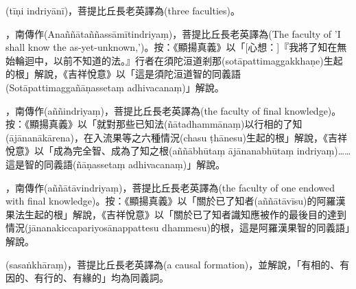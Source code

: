 \startitemgroup[noteitems]
\item{}(tīṇi indriyānī)，菩提比丘長老英譯為(three faculties)。
\stopitemgroup

\startitemgroup[noteitems]
\item{}，南傳作(Anaññātaññassāmītindriyaṃ)，菩提比丘長老英譯為(The faculty of 'I shall know the as-yet-unknown,')。按：《顯揚真義》以「[心想：]『我將了知在無始輪迴中，以前不知道的法。』行者在須陀洹道剎那(sotāpattimaggakkhaṇe)生起的根」解說，《吉祥悅意》以「這是須陀洹道智的同義語(Sotāpattimaggañāṇassetaṃ adhivacanaṃ)」解說。
\stopitemgroup

\startitemgroup[noteitems]
\item{}，南傳作(aññindriyaṃ)，菩提比丘長老英譯為(the faculty of final knowledge)。按：《顯揚真義》以「就對那些已知法(ñātadhammānaṃ)以行相的了知(ājānanākārena)，在入流果等之六種情況(chasu ṭhānesu)生起的根」解說，《吉祥悅意》以「成為完全智、成為了知之根(aññābhūtaṃ ājānanabhūtaṃ indriyaṃ)……這是智的同義語(ñāṇassetaṃ adhivacanaṃ)」解說。
\stopitemgroup

\startitemgroup[noteitems]
\item{}，南傳作(aññātāvindriyaṃ)，菩提比丘長老英譯為(the faculty of one endowed with final knowledge)。按：《顯揚真義》以「關於已了知者(aññātāvīsu)的阿羅漢果法生起的根」解說，《吉祥悅意》以「關於已了知者識知應被作的最後目的達到情況(jānanakiccapariyosānappattesu dhammesu)的根，這是阿羅漢果智的同義語」解說。
\stopitemgroup

\startitemgroup[noteitems]
\item{}(sasaṅkhāraṃ)，菩提比丘長老英譯為(a causal formation)，並解說，「有相的、有因的、有行的、有緣的」均為同義詞。
\stopitemgroup

